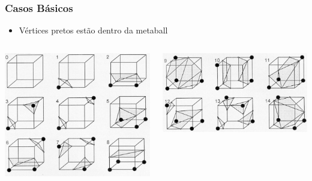 \documentclass[brazil]{beamer}
\begin{document}
    \begin{frame}
      \frametitle{Casos Básicos}
        \begin{itemize}
          \item Vértices pretos estão dentro da metaball
        \end{itemize}
        \begin{columns}
        \begin{column}{0.48\textwidth}
          \begin{center}
            \includegraphics[width=1.0\textwidth]{imgs/base-cases-1.png}
          \end{center}
        \end{column}
        \begin{column}{0.48\textwidth}
          \begin{center}
            \includegraphics[width=1.0\textwidth]{imgs/base-cases-2.png}
          \end{center}
        \end{column}
      \end{columns}
    \end{frame}        
\end{document}
